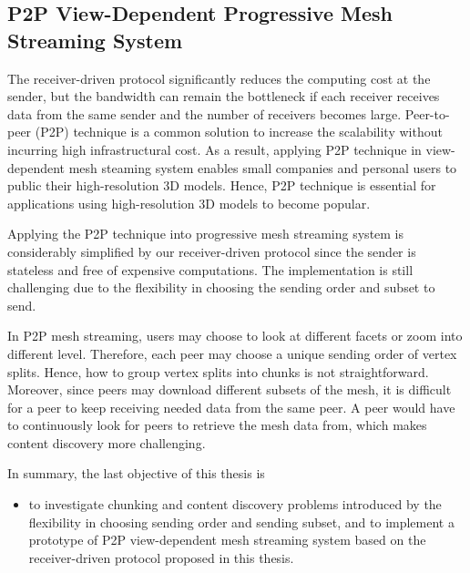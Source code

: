 \documentclass[11pt, a4paper]{report}
\begin{document}
    \subsection{P2P View-Dependent Progressive Mesh Streaming System}
    The receiver-driven protocol significantly reduces the computing cost at the sender,
    but the bandwidth can remain the bottleneck if each receiver receives data
    from the same sender and the number of receivers becomes large. 
    Peer-to-peer (P2P) technique is a common solution to increase
    the scalability without incurring high infrastructural cost. 
    As a result, applying P2P technique in view-dependent mesh steaming
    system enables small companies and personal users to public
    their high-resolution 3D models. Hence, P2P technique is essential
    for applications using high-resolution 3D models to become popular.
    
    Applying the P2P technique into progressive mesh streaming system
    is considerably simplified by our receiver-driven protocol since 
    the sender is stateless and free of expensive computations.
    The implementation is still challenging due to the flexibility
    in choosing the sending order and subset to send.
    
    In P2P mesh streaming, users 
    may choose to look at different facets or zoom into different level.
    Therefore, each peer may choose a unique sending order of
    vertex splits. Hence, how to group vertex splits into chunks is not
    straightforward. Moreover, since peers may download different subsets of the
    mesh, it is difficult for a peer to keep receiving
    needed data from the same peer.  
    A peer would have to continuously look for peers to retrieve the mesh data from, 
    which makes content discovery more challenging.

    In summary, the last objective of this thesis is 
    \begin{itemize}
        \item
            to investigate chunking and content discovery problems introduced by 
            the flexibility in choosing sending order and sending subset, and
            to implement a prototype of P2P view-dependent mesh streaming system
            based on the receiver-driven protocol proposed in this thesis.
    \end{itemize}
    
\end{document}
